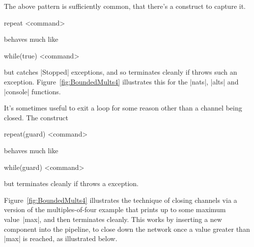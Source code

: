 The above pattern is sufficiently common, that there's a construct to capture
it.
%
\begin{scala}
  repeat{ <command> }
\end{scala}
%
behaves much like
\begin{scala}
  while(true){ <command> }
\end{scala}
but catches |Stopped| exceptions, and so terminates cleanly if
 throws such an exception.  Figure~\ref{fig:BoundedMults4}
illustrates this for the |nats|, |alts| and |console| functions.


It's sometimes useful to exit a loop for some reason other than a channel
being closed.  The construct
%
\begin{scala}
  repeat(guard){ <command> }
\end{scala}
%
behaves much like
\begin{scala}
  while(guard){ <command> }
\end{scala}
but terminates cleanly if  throws a 
exception.


Figure~\ref{fig:BoundedMults4} illustrates the technique of closing channels
via a version of the multiples-of-four example that prints up to some maximum
value~|max|, and then terminates cleanly.  This works by inserting a new
component into the pipeline, to close down the network once a value greater
than |max| is reached, as illustrated below.
%
\begin{center}
\end{center}

